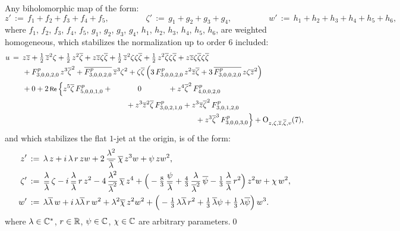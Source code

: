 \documentclass[12pt,twoside,leqno,openany]{amsart}
\begin{document}
\begin{Lemma}
\label{Lm-isotropy-order-6}
Any biholomorphic map of the form:
\[
z'
\,:=\,
f_1+f_2+f_3+f_4+f_5,
\ \ \ \ \ \ \ \ \ \ \ \ \ \ \ \ \ \ \ \
\zeta'
\,:=\,
g_1+g_2+g_3+g_4,
\ \ \ \ \ \ \ \ \ \ \ \ \ \ \ \ \ \ \ \
w'
\,:=\,
h_1+h_2+h_3+h_4+h_5+h_6,
\]
where $f_1$, $f_2$, $f_3$, $f_4$, $f_5$, $g_1$, $g_2$, $g_3$, $g_4$,
$h_1$, $h_2$, $h_3$, $h_4$, $h_5$, $h_6$, are weighted homogeneous,
which stabilizes the normalization up to order $6$ included:
\[
\aligned
u
&
\,=\,
z\overline{z}
+
\tfrac{1}{2}\,\overline{z}^2\zeta
+
\tfrac{1}{2}\,z^2\overline{\zeta}
+
z\overline{z}\zeta\overline{\zeta}
+
\tfrac{1}{2}\,\overline{z}^2\zeta\zeta\overline{\zeta}
+
\tfrac{1}{2}\,z^2\overline{\zeta}\zeta\overline{\zeta}
+
z\overline{z}\zeta\overline{\zeta}\zeta\overline{\zeta}
\\
&
\ \ \ \ \
+
F_{3,0,0,2,0}^p\,z^3\overline{\zeta}^2
+
\overline{F_{3,0,0,2,0}^p}\,\overline{z}^3\zeta^2
+
\zeta\overline{\zeta}\,
\Big(
3\,F_{3,0,0,2,0}^p\,
z^2\overline{z}\overline{\zeta}
+
3\,\overline{F_{3,0,0,2,0}^p}\,
z\zeta\overline{z}^2
\Big)
\\
&
\ \ \ \ \
+
0
+
2\,\Re\,\Big\{
z^5\overline{\zeta}\,
F_{5,0,0,1,0}^p
+
\ \ \ \ \ \ \ \ \ \
0
\ \ \ \ \ \ \ \ \ \ \,
+
z^4\overline{\zeta}^2\,
F_{4,0,0,2,0}^p
\\
&
\ \ \ \ \ \ \ \ \ \ \ \ \ \ \ \ \ \ \ \ \ \ \ \ \ \ \ \ \ \ \ \ \ \ \
\ \ \ \ \ \ \ \ \ \ \ 
+
z^3\overline{z}^2\overline{\zeta}\,
F_{3,0,2,1,0}^p
+
z^3\overline{z}\overline{\zeta}^2\,
F_{3,0,1,2,0}^p
\\
&
\ \ \ \ \ \ \ \ \ \ \ \ \ \ \ \ \ \ \ \ \ \ \ \ \ \ \ \ \ \ \ \ \ \ \
\ \ \ \ \ \ \ \ \ \ \ \ \ \ \ \ \ \ \ \ \ \ \ \ \ \ \ 
\ \ \ \ \ \ \ \ \ \ \ \,
+
z^3\overline{\zeta}^3\,
F_{3,0,0,3,0}^p
\Big\}
+
{\rm O}_{z,\zeta,\overline{z},\overline{\zeta},v}(7),
\endaligned
\]
and which stabilizes the flat $1$-jet at the origin, 
is of the form:
\[
\aligned
z'
&
\,:=\,
\lambda\,z
+
i\,\lambda\,r\,
zw
+
2\,\frac{\lambda^2}{\overline{\lambda}}\,\overline{\chi}\,
z^3w
+
\psi\,
zw^2,
\\
\zeta'
&
\,:=\,
\frac{\lambda}{\overline{\lambda}}\,
\zeta
-
i\,
\frac{\lambda}{\overline{\lambda}}\,r\,
z^2
-
4\,\frac{\lambda^2}{\overline{\lambda}^2}\,\overline{\chi}\,
z^4
+
\Big(
-\tfrac{8}{3}\,\frac{\psi}{\overline{\lambda}}
+
\tfrac{4}{3}\,\frac{\lambda}{\overline{\lambda}^2}\,
\overline{\psi}
-
\tfrac{1}{3}\,\frac{\lambda}{\overline{\lambda}}\,r^2
\Big)\,
z^2w
+
\chi\,w^2,
\\
w'
&
\,:=\,
\lambda\overline{\lambda}\,w
+
i\,\lambda\overline{\lambda}\,r\,
w^2
+
\lambda^2\overline{\chi}\,
z^2w^2
+
\Big(
-\tfrac{1}{3}\,\lambda\overline{\lambda}\,r^2
+
\tfrac{1}{3}\,\overline{\lambda}\psi
+
\tfrac{1}{3}\,\lambda\overline{\psi}
\Big)\,
w^3.
\endaligned
\]
where $\lambda \in \mathbb{C}^\ast$, $r \in \mathbb{R}$,
$\psi \in \mathbb{C}$, $\chi \in \mathbb{C}$ are arbitrary
parameters.\qed
\end{Lemma}
\end{document}
